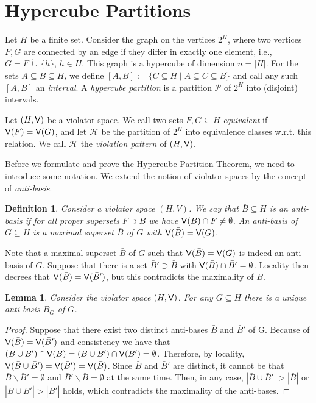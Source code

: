 \documentclass[12pt]{article}
\def\Violators{{\sf V}}
\newtheorem{lemma2}[theorem2]{Lemma}
\newenvironment{lemma}{\begin{lemma2}}{\end{lemma2}}
\newtheorem{definition2}[theorem2]{Definition}
\newenvironment{definition}{\begin{definition2}}{\end{definition2}}
\theoremstyle{remark}
\begin{document}
\section{Hypercube Partitions}
Let $H$ be a finite set. Consider the graph on the vertices $2^H$, where two vertices $F, G$
are connected by an edge if they differ in exactly one element, i.e., $G=F\,\dot{\cup}\,\{h\}$, $h\in H$.
This graph is a hypercube of dimension $n=|H|$. For
the sets $A \subseteq  B\subseteq H$, we define 
 $[A, B]:= \{C\subseteq H \;|\; A\subseteq C \subseteq B\}$ and call any such
 $[A,B]$ an \emph{interval}. A \emph{hypercube  partition} is a partition $\mathcal{P}$
 of $2^H$ into (disjoint) intervals.
 
 Let $(H,\Violators)$ be a violator space. We call two sets $F,G\subseteq H$ \emph{equivalent}
 if $\Violators(F)=\Violators(G)$, and let $\mathcal{H}$ be the partition of $2^H$ into
 equivalence classes w.r.t. this relation. We call $\mathcal{H}$ the \emph{violation pattern}
 of $(H,\Violators)$.
 

Before we formulate and prove the Hypercube Partition Theorem, we need to introduce some 
notation. We extend the notion of violator spaces by the concept of \emph{anti-basis}.

\begin{definition}
Consider a violator space $(H,V)$. We say that $\bar{B}\subseteq H$ is an \emph{anti-basis} if
for all proper supersets $F \supset \bar{B}$ we have $\Violators(\bar{B})\cap F \neq \emptyset$.
An anti-basis of $G\subseteq H$ is a maximal superset $\bar{B}$ of $G$ with $\Violators(\bar{B})=
\Violators(G)$. 
 \end{definition}
 
 Note that a maximal superset $\bar{B}$ of $G$ such that $\Violators(\bar{B})=\Violators(G)$ is 
indeed 
 an anti-basis of $G$. Suppose that there is a set $\bar{B}' \supset \bar{B}$ with
 $\Violators(\bar{B})\cap\bar{B}'=\emptyset$. Locality then decrees that $\Violators(\bar{B})=
\Violators(\bar{B}')$, but this contradicts the maximality of $\bar{B}$.
 
 \begin{lemma}
 \label{lemma:uniqueantibasis}
Consider  the violator space $(H,\Violators)$. For any $G\subseteq H$ there is a unique
 anti-basis $\bar{B}_G$ of $G$.  
 \end{lemma}

 \begin{proof}
 Suppose that there exist two distinct anti-bases $\bar{B}$ and $\bar{B}'$ of G.
 Because of $\Violators(\bar{B})=\Violators(\bar{B}')$ and consistency we have that
 $(\bar{B}\cup\bar{B}')\cap \Violators(\bar{B}) = (\bar{B}\cup\bar{B}')\cap \Violators(\bar{B}') = 
\emptyset$.
 Therefore, by locality, $\Violators(\bar{B}\cup\bar{B}') = \Violators(\bar{B}') = \Violators(\bar{B})$.
 Since $\bar{B}$ and $\bar{B}'$ are distinct, it cannot be that
  $\bar{B}\backslash\bar{B}'= \emptyset$ and $\bar{B}'\backslash\bar{B} = \emptyset$
  at the same time. Then, in any case, $|\bar{B}\cup\bar{B}'|>|\bar{B}|$ or $|\bar{B}\cup\bar{B}'|>|
\bar{B}'|$
  holds, which contradicts the maximality of the anti-bases.
   \end{proof}
   
\end{document}
